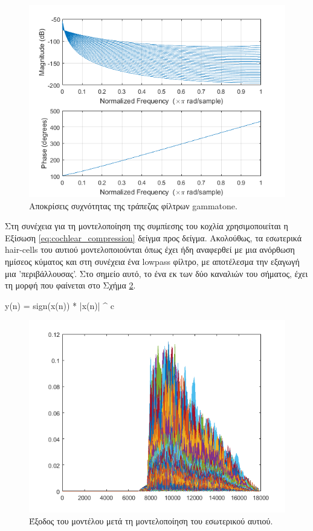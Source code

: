 \begin{figure}[h]
  \centering
  \includegraphics[width=\textwidth]{images/gammatone_responses.png}
  \caption{Αποκρίσεις συχνότητας της τράπεζας φίλτρων gammatone.}
  \label{fig:gammatone_responses}
\end{figure}

Στη συνέχεια για τη μοντελοποίηση της συμπίεσης του κοχλία χρησιμοποιείται η Εξίσωση \ref{eq:cochlear_compression} δείγμα προς δείγμα. Ακολούθως, τα εσωτερικά hair-cells του αυτιού μοντελοποιούνται όπως έχει ήδη αναφερθεί με μια ανόρθωση ημίσεος κύματος και στη συνέχεια ένα lowpass φίλτρο, με αποτέλεσμα την εξαγωγή μια 'περιβάλλουσας'. Στο σημείο αυτό, το ένα εκ των δύο καναλιών του σήματος, έχει τη μορφή που φαίνεται στο Σχήμα \ref{fig:dietz_out2}.

\begin{CEquation}
    y(n) = sign(x(n)) * |x(n)| ^ c
    \label{eq:cochlear_compression}
\end{CEquation}

\begin{figure}[h]
  \centering
  \includegraphics[width=\textwidth]{images/dietz_out2.png}
  \caption{Έξοδος του μοντέλου μετά τη μοντελοποίηση του εσωτερικού αυτιού.}
  \label{fig:dietz_out2}
\end{figure}

